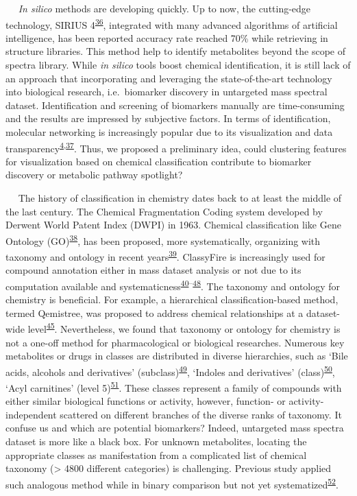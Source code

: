    \emph{In silico} methods are developing quickly. Up to now, the
cutting-edge technology, SIRIUS
4\textsuperscript{\protect\hyperlink{ref-2019}{36}}, integrated with
many advanced algorithms of artificial intelligence, has been reported
accuracy rate reached 70\% while retrieving in structure libraries. This
method help to identify metabolites beyond the scope of spectra library.
While \emph{in silico} tools boost chemical identification, it is still
lack of an approach that incorporating and leveraging the
state-of-the-art technology into biological research, i.e.~biomarker
discovery in untargeted mass spectral dataset. Identification and
screening of biomarkers manually are time-consuming and the results are
impressed by subjective factors. In terms of identification, molecular
networking is increasingly popular due to its visualization and data
transparency\textsuperscript{\protect\hyperlink{ref-2016a}{4},\protect\hyperlink{ref-2020b}{37}}.
Thus, we proposed a preliminary idea, could clustering features for
visualization based on chemical classification contribute to biomarker
discovery or metabolic pathway spotlight?

   The history of classification in chemistry dates back to at least the
middle of the last century. The Chemical Fragmentation Coding system
developed by Derwent World Patent Index (DWPI) in 1963. Chemical
classification like Gene Ontology
(GO)\textsuperscript{\protect\hyperlink{ref-2000g}{38}}, has been
proposed, more systematically, organizing with taxonomy and ontology in
recent years\textsuperscript{\protect\hyperlink{ref-2016}{39}}.
ClassyFire is increasingly used for compound annotation either in mass
dataset analysis or not due to its computation available and
systematicness\textsuperscript{\protect\hyperlink{ref-2019bt}{40}--\protect\hyperlink{ref-2022al}{48}}.
The taxonomy and ontology for chemistry is beneficial. For example, a
hierarchical classification-based method, termed Qemistree, was proposed
to address chemical relationships at a dataset-wide
level\textsuperscript{\protect\hyperlink{ref-2021b}{45}}. Nevertheless,
we found that taxonomy or ontology for chemistry is not a one-off method
for pharmacological or biological researches. Numerous key metabolites
or drugs in classes are distributed in diverse hierarchies, such as
`Bile acids, alcohols and derivatives'
(subclass)\textsuperscript{\protect\hyperlink{ref-2020cr}{49}}, `Indoles
and derivatives'
(class)\textsuperscript{\protect\hyperlink{ref-2022am}{50}}, `Acyl
carnitines' (level
5)\textsuperscript{\protect\hyperlink{ref-2020s}{51}}. These classes
represent a family of compounds with either similar biological functions
or activity, however, function- or activity-independent scattered on
different branches of the diverse ranks of taxonomy. It confuse us and
which are potential biomarkers? Indeed, untargeted mass spectra dataset
is more like a black box. For unknown metabolites, locating the
appropriate classes as manifestation from a complicated list of chemical
taxonomy (\textgreater{} 4800 different categories) is challenging.
Previous study applied such analogous method while in binary comparison
but not yet
systematized\textsuperscript{\protect\hyperlink{ref-2021a}{52}}.

